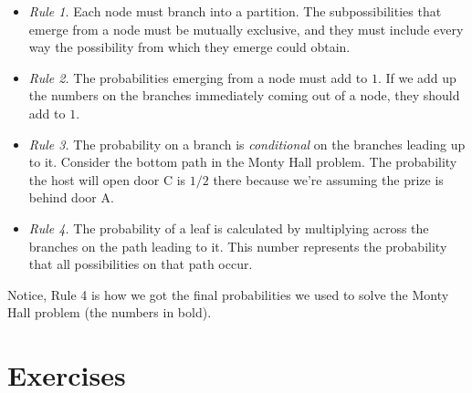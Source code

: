 \documentclass[justified]{tufte-book}
\theoremstyle{definition}
\theoremstyle{definition}
\theoremstyle{definition}
\theoremstyle{definition}
\theoremstyle{remark}
\begin{document}
\begin{itemize}
\item
  \emph{Rule 1.} Each node must branch into a partition. The subpossibilities that emerge from a node must be mutually exclusive, and they must include every way the possibility from which they emerge could obtain.
\item
  \emph{Rule 2.} The probabilities emerging from a node must add to \(1\). If we add up the numbers on the branches immediately coming out of a node, they should add to \(1\).
\item
  \emph{Rule 3.} The probability on a branch is \emph{conditional} on the branches leading up to it. Consider the bottom path in the Monty Hall problem. The probability the host will open door C is \(1/2\) there because we're assuming the prize is behind door A.
\item
  \emph{Rule 4.} The probability of a leaf is calculated by multiplying across the branches on the path leading to it. This number represents the probability that all possibilities on that path occur.
\end{itemize}

Notice, Rule 4 is how we got the final probabilities we used to solve the Monty Hall problem (the numbers in bold).

\hypertarget{exercises}{%
\section*{Exercises}\label{exercises}}
\end{document}
